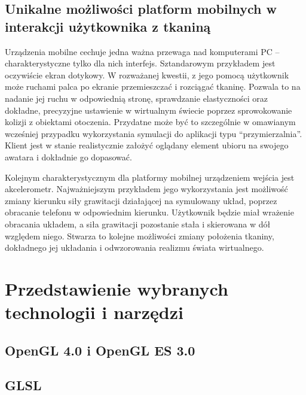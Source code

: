		\subsection{Unikalne możliwości platform mobilnych w interakcji użytkownika z tkaniną}
		\label{t:technologie:mobilne:interakcja}
		
		
		Urządzenia mobilne cechuje jedna ważna przewaga nad komputerami PC -- charakterystyczne tylko dla nich interfejs. Sztandarowym przykładem jest oczywiście ekran dotykowy. W rozważanej kwestii, z jego pomocą użytkownik może ruchami palca po ekranie przemieszczać i rozciągać tkaninę. Pozwala to na nadanie jej ruchu w odpowiednią stronę, sprawdzanie elastyczności oraz dokładne, precyzyjne ustawienie w wirtualnym świecie poprzez sprowokowanie kolizji z obiektami otoczenia. Przydatne może być to szczególnie w omawianym wcześniej przypadku wykorzystania symulacji do aplikacji typu ``przymierzalnia''. Klient jest w stanie realistycznie założyć oglądany element ubioru na swojego awatara i dokładnie go dopasować. 
		
		Kolejnym charakterystycznym dla platformy mobilnej urządzeniem wejścia jest akcelerometr. Najważniejszym przykładem jego wykorzystania jest możliwość zmiany kierunku siły grawitacji działającej na symulowany układ, poprzez obracanie telefonu w odpowiednim kierunku. Użytkownik będzie miał wrażenie obracania układem, a siła grawitacji pozostanie stała i skierowana w dół względem niego. Stwarza to kolejne możliwości zmiany położenia tkaniny, dokładnego jej układania i odwzorowania realizmu świata wirtualnego.

	
	\section{Przedstawienie wybranych technologii i narzędzi}
	\label{t:technologie:narzedzia}
	
		\subsection{OpenGL 4.0 i OpenGL ES 3.0}
		\label{t:technologie:narzedzia:ogl}
		
		
		\subsection{GLSL}
		\label{t:technologie:narzedzia:glsl}
		
